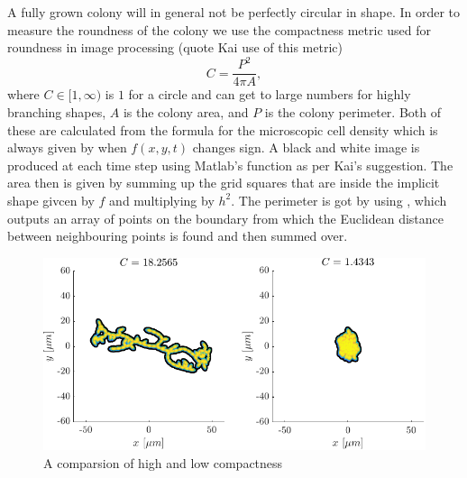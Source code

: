 A fully grown colony will in general not be perfectly circular in shape.
 In order to measure the roundness of the colony we use the compactness metric used for 
 roundness in image processing (quote Kai use of this metric)
\begin{equation}
  C = \frac{P^2}{4 \pi A},
\end{equation}
where $C \in [1, \infty)$ is $1$ for a circle and can get to large numbers for 
highly branching shapes, $A$ is the colony area, and $P$ is the colony perimeter. 
Both of these are calculated from the formula for the microscopic cell
density which is always given by when $f(x,y,t)$ changes sign. A black and white image 
is produced at each time step using Matlab's function  as per
Kai's suggestion. The area then is given by summing up the grid squares that are
inside the implicit shape givcen by $f$ and multiplying by $h^2$. The perimeter
is got by using , which outputs an array of points on the boundary
from which the Euclidean distance between neighbouring points is found and then summed over.
\begin{figure}[!htb]
    \centering
    \includegraphics[width=\textwidth]{chapter1/figures/compareCompactness.pdf}
    \caption{A comparsion of high and low compactness}
    \label{fig:compatness_comparison}
\end{figure}

